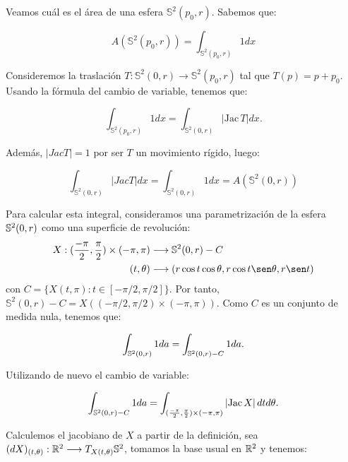 \begin{remark}
Veamos cuál es el área de una esfera $\mathbb{S}^2(p_0, r)$. Sabemos que:

\begin{equation*}
    A(\mathbb{S}^2(p_0, r)) = \int_{\mathbb{S}^2(p_0, r)} 1dx
\end{equation*}

Consideremos la traslación $T: \mathbb{S}^2(0, r) \longrightarrow \mathbb{S}^2(p_0, r)$ tal que $T(p) = p + p_0$. Usando la fórmula del cambio de variable, tenemos que:

\begin{equation*}
    \int_{\mathbb{S}^2(p_0, r)} 1dx = \int_{\mathbb{S}^2(0, r)} |\text{Jac} \, T|dx.
\end{equation*}

Además, $|JacT|=1$ por ser $T$ un movimiento rígido, luego:

\begin{equation*}
    \int_{\mathbb{S}^2(0, r)} |Jac T|dx = \int_{\mathbb{S}^2(0, r)} 1dx = A(\mathbb{S}^2(0, r))
\end{equation*}

Para calcular esta integral, consideramos una parametrización de la esfera $\mathbb{S}^2 (0,r)$ como una superficie de revolución: 
%
\begin{align*}
    X: (\frac{-\pi}{2}, \frac{\pi}{2}) \times (-\pi, \pi) &\longrightarrow \mathbb{S}^2(0, r) - C \\
    (t, \theta) &\longrightarrow (r\cos t\cos\theta, r\cos t\sen\theta, r\sen t)
\end{align*}
%
con $C = \{X(t,\pi): t\in [-\pi/2, \pi/2]\}$. Por tanto, $\mathbb{S}^2(0, r) - C = X((-\pi/2, \pi/2) \times (-\pi, \pi))$. Como $C$ es un conjunto de medida nula, tenemos que:

\begin{equation*}
    \int_{\mathbb{S}^2(0, r)} 1da = \int_{\mathbb{S}^2(0, r) - C} 1da.
\end{equation*}

Utilizando de nuevo el cambio de variable:

\begin{equation*}
    \int_{\mathbb{S}^2(0, r) - C} 1da = \int_{(\frac{-\pi}{2}, \frac{\pi}{2}) \times (-\pi, \pi)} |\text{Jac} \, X| \, dtd\theta.
\end{equation*}

Calculemos el jacobiano de $X$ a partir de la definición, sea $(dX)_{(t, \theta)}: \mathbb{R}^2 \longrightarrow T_{X(t,\theta)} \mathbb{S}^2$, tomamos la base usual en $\mathbb{R}^2$ y tenemos:


\end{remark}
